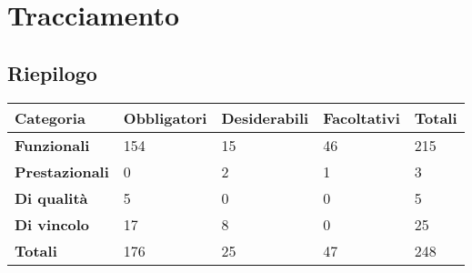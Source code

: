 %


\section{Tracciamento} %
\label{sec:tracciamento}
	
	

	\subsection{Riepilogo}

	\begin{center}

		\def\arraystretch{1.5}
		\bgroup
		\begin{longtable}{| p{2.7cm} | p{2.4cm} | p{2.4cm} | p{2.4cm} | p{1.7cm} |}

			\hline
			\textbf{Categoria} & \textbf{Obbligatori} & \textbf{Desiderabili} & \textbf{Facoltativi} & \textbf{Totali} \\
			\hline

			\textbf{Funzionali}  & 154 & 15 & 46 & 215 \\
			\hline
			\textbf{Prestazionali} & 0 & 2 & 1 & 3 \\
			\hline
			\textbf{Di qualità} & 5 & 0 & 0 & 5 \\
			\hline
			\textbf{Di vincolo} & 17 & 8 & 0 & 25 \\
			\hline
			\textbf{Totali}  & 176 & 25 & 47 & 248 \\
			\hline
		\end{longtable}
		\egroup
	\end{center}

